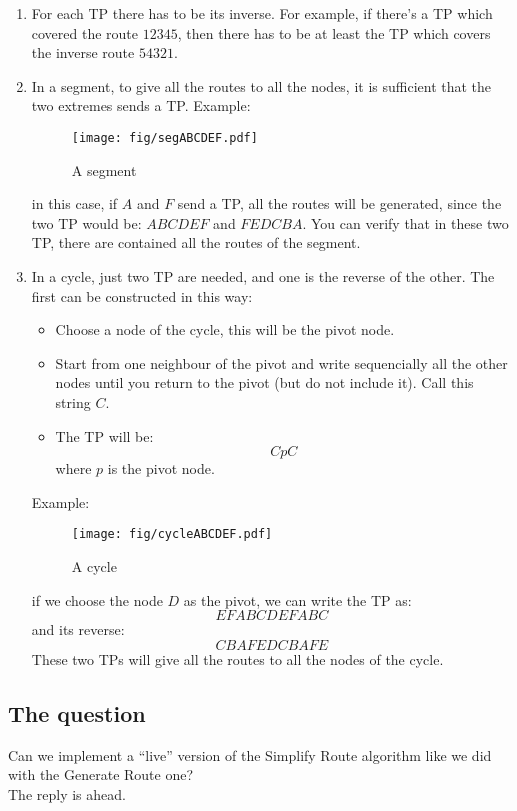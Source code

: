 \documentclass[a4paper]{article}
\begin{document}
\begin{enumerate}
	\item For each TP there has to be its inverse. For example, if there's
		a TP which covered the route $12345$, then there has to be at
		least the TP which covers the inverse route $54321$.
	\item In a segment, to give all the routes to all the nodes, it is
		sufficient that the two extremes sends a TP. Example:
		\begin{figure}[h]
			\begin{center}
				\texttt{[image: fig/segABCDEF.pdf]}
			\end{center}
			\caption{A segment}
		\end{figure}
		in this case, if $A$ and $F$ send a TP, all the routes will be
		generated, since the two TP would be: $ABCDEF$ and $FEDCBA$.
		You can verify that in these two TP, there are contained all
		the routes of the segment.
	\item In a cycle, just two TP are needed, and one is the reverse of
		the other. The first can be constructed in this way: 
		\begin{itemize}
			\item Choose a node of the cycle, this will be the
				pivot node.
			\item Start from one neighbour of the pivot and write
				sequencially all the other nodes until you
				return to the pivot (but do not include it).
				Call this string $C$.
			\item The TP will be:
				\[CpC\]
				where $p$ is the pivot node.
		\end{itemize}
		Example:
		\begin{figure}[h]
			\begin{center}
				\texttt{[image: fig/cycleABCDEF.pdf]}
			\end{center}
			\caption{A cycle}
		\end{figure}
		if we choose the node $D$ as the pivot, we can write the TP
		as:
		\[ EFABCDEFABC \]
		and its reverse:
		\[ CBAFEDCBAFE \]
		These two TPs will give all the routes to all the nodes of the
		cycle.
\end{enumerate}

\subsection{The question}

Can we implement a ``live'' version of the Simplify Route algorithm like we
did with the Generate Route one?\\
The reply is ahead.
\end{document}
